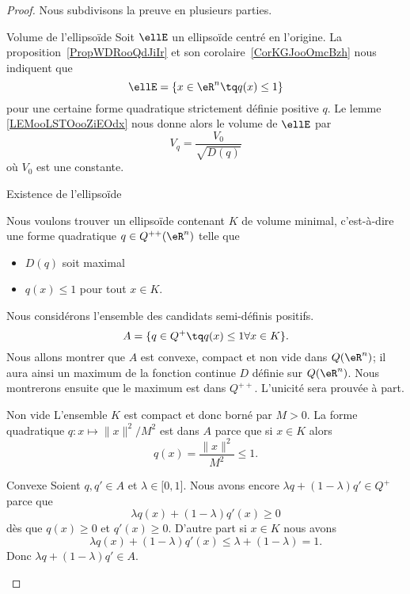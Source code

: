 \begin{proof}
	Nous subdivisons la preuve en plusieurs parties.
	\begin{subproof}
		\item[Volume de l'ellipsoïde]
		Soit \( \ellE\) un ellipsoïde centré en l'origine. La proposition~\ref{PropWDRooQdJiIr} et son corolaire~\ref{CorKGJooOmcBzh} nous indiquent que
		\begin{equation}
			\ellE=\{ x\in \eR^n\tq q(x)\leq 1 \}
		\end{equation}
		pour une certaine forme quadratique strictement définie positive \( q\). Le lemme \ref{LEMooLSTOooZiEOdx} nous donne alors le volume de \( \ellE\) par
		\begin{equation}
			V_q=\frac{ V_0 }{ \sqrt{ D(q) } }
		\end{equation}
		où \( V_0\) est une constante.
		\item[Existence de l'ellipsoïde]

		Nous voulons trouver un ellipsoïde contenant \( K\) de volume minimal, c'est-à-dire une forme quadratique \( q\in Q^{++}(\eR^n)\) telle que
		\begin{itemize}
			\item \( D(q)\) soit maximal
			\item \( q(x)\leq 1\) pour tout \( x\in K\).
		\end{itemize}
		Nous considérons l'ensemble des candidats semi-définis positifs.
		\begin{equation}
			A=\{ q\in Q^+\tq q(x)\leq 1\forall x\in K \}.
		\end{equation}
		Nous allons montrer que \( A\) est convexe, compact et non vide dans \( Q(\eR^n)\); il aura ainsi un maximum de la fonction continue \( D\) définie sur \( Q(\eR^n)\). Nous montrerons ensuite que le maximum est dans \( Q^{++}\). L'unicité sera prouvée à part.

		\begin{subproof}
			\item[Non vide]
			L'ensemble \( K\) est compact et donc borné par \( M>0\). La forme quadratique \( q\colon x\mapsto \| x \|^2/M^2\) est dans \( A\) parce que si \( x\in K\) alors
			\begin{equation}
				q(x)=\frac{ \| x \|^2 }{ M^2 }\leq 1.
			\end{equation}
			\item[Convexe]
			Soient \( q,q'\in A\) et \( \lambda\in\mathopen[ 0 , 1 \mathclose]\). Nous avons encore \( \lambda q+(1-\lambda)q'\in Q^+\) parce que
			\begin{equation}
				\lambda q(x)+(1-\lambda)q'(x)\geq 0
			\end{equation}
			dès que \( q(x)\geq 0\) et \( q'(x)\geq 0\).
			D'autre part si \( x\in K\) nous avons
			\begin{equation}
				\lambda q(x)+(1-\lambda)q'(x)\leq \lambda+(1-\lambda)=1.
			\end{equation}
			Donc \( \lambda q+(1-\lambda)q'\in A\).


\end{subproof}
\end{subproof}
\end{proof}
